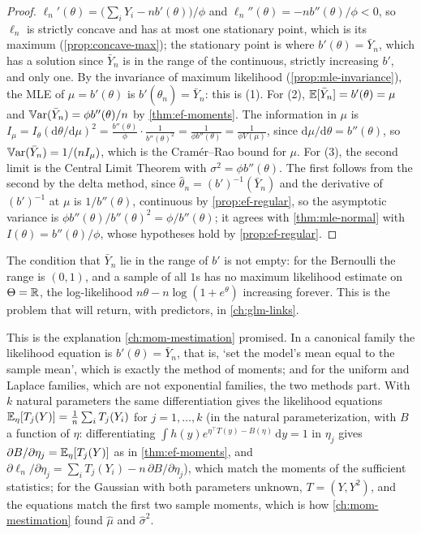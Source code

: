 \begin{proof}
$\ell_n'(\theta) = \big(\sum_i Y_i - nb'(\theta)\big)/\phi$ and $\ell_n''(\theta) = -nb''(\theta)/\phi < 0$, so $\ell_n$ is strictly concave and has at most one stationary point, which is its maximum (\cref{prop:concave-max}); the stationary point is where $b'(\theta) = \bar{Y}_n$, which has a solution since $\bar{Y}_n$ is in the range of the continuous, strictly increasing $b'$, and only one.
By the invariance of maximum likelihood (\cref{prop:mle-invariance}), the MLE of $\mu = b'(\theta)$ is $b'(\hat{\theta}_n) = \bar{Y}_n$: this is (1).
For (2), $\operatorname*{\mathbb{E}}[\bar{Y}_n] = b'(\theta) = \mu$ and $\operatorname*{\mathbb{V}\text{ar}}(\bar{Y}_n) = \phi b''(\theta)/n$ by \cref{thm:ef-moments}.
The information in $\mu$ is $I_\mu = I_\theta(\mathrm{d}\theta/\mathrm{d}\mu)^2 = \frac{b''(\theta)}{\phi}\cdot\frac{1}{b''(\theta)^2} = \frac{1}{\phi b''(\theta)} = \frac{1}{\phi V(\mu)}$, since $\mathrm{d}\mu/\mathrm{d}\theta = b''(\theta)$, so $\operatorname*{\mathbb{V}\text{ar}}(\bar{Y}_n) = 1/(nI_\mu)$, which is the Cram\'er--Rao bound for $\mu$.
For (3), the second limit is the Central Limit Theorem with $\sigma^2 = \phi b''(\theta)$.
The first follows from the second by the delta method, since $\hat{\theta}_n = (b')^{-1}(\bar{Y}_n)$ and the derivative of $(b')^{-1}$ at $\mu$ is $1/b''(\theta)$, continuous by \cref{prop:ef-regular}, so the asymptotic variance is $\phi b''(\theta)/b''(\theta)^2 = \phi/b''(\theta)$; it agrees with \cref{thm:mle-normal} with $I(\theta) = b''(\theta)/\phi$, whose hypotheses hold by \cref{prop:ef-regular}.
\end{proof}

The condition that $\bar{Y}_n$ lie in the range of $b'$ is not empty: for the Bernoulli the range is $(0, 1)$, and a sample of all $1$s has no maximum likelihood estimate on $\Theta = \mathbb{R}$, the log-likelihood $n\theta - n\log(1 + e^\theta)$ increasing forever.
This is the problem that will return, with predictors, in \cref{ch:glm-links}.

This is the explanation \cref{ch:mom-mestimation} promised.
In a canonical family the likelihood equation is $b'(\theta) = \bar{Y}_n$, that is, `set the model's mean equal to the sample mean', which is exactly the method of moments; and for the uniform and Laplace families, which are not exponential families, the two methods part.
With $k$ natural parameters the same differentiation gives the likelihood equations $\operatorname*{\mathbb{E}}_\eta[T_j(Y)] = \frac1n\sum_i T_j(Y_i)$ for $j = 1, \ldots, k$ (in the natural parameterization, with $B$ a function of $\eta$: differentiating $\int h(y)e^{\eta^\top T(y) - B(\eta)}\,\mathrm{d}y = 1$ in $\eta_j$ gives $\partial B/\partial\eta_j = \operatorname*{\mathbb{E}}_\eta[T_j(Y)]$ as in \cref{thm:ef-moments}, and $\partial\ell_n/\partial\eta_j = \sum_i T_j(Y_i) - n\,\partial B/\partial\eta_j$), which match the moments of the sufficient statistics; for the Gaussian with both parameters unknown, $T = (Y, Y^2)$, and the equations match the first two sample moments, which is how \cref{ch:mom-mestimation} found $\hat{\mu}$ and $\hat{\sigma}^2$.

